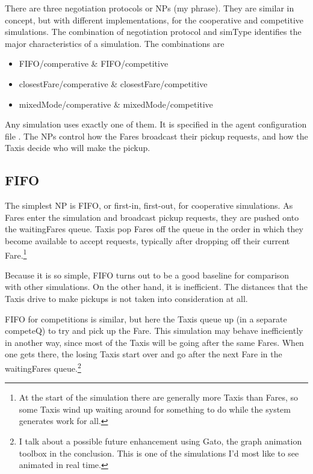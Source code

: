 \documentclass[11pt,letterpaper,onecolumn,twoside,openright,final]{report}
\begin{document}
There are three negotiation protocols or NPs (my phrase).
They are similar in concept, but with different implementations, for the cooperative and competitive simulations.
The combination of negotiation protocol and simType identifies the major characteristics of a simulation.
The combinations are

\vspace{0.5cm}
\begin{itemize}
  \item{FIFO/comperative \& FIFO/competitive}
  \item{closestFare/comperative \& closestFare/competitive}
  \item{mixedMode/comperative \& mixedMode/competitive}
\end{itemize}
\vspace{0.5cm}

Any simulation uses exactly one of them.
It is specified in the agent configuration file .
The NPs control how the Fares broadcast their pickup requests, and how the Taxis decide who will make the pickup.

\subsection{FIFO}
The simplest NP is FIFO, or first-in, first-out, for cooperative simulations.
As Fares enter the simulation and broadcast pickup requests, they are pushed onto the waitingFares queue.
Taxis pop Fares off the queue in the order in which they become available to accept requests, typically after dropping off their current Fare.\footnote{At the start of the simulation there are generally more Taxis than Fares, so some Taxis wind up waiting around for something to do while the system generates work for all.}

Because it is so simple, FIFO turns out to be a good baseline for comparison with other simulations.
On the other hand, it is inefficient.
The distances that the Taxis drive to make pickups is not taken into consideration at all.

FIFO for competitions is similar, but here the Taxis queue up (in a separate competeQ) to try and pick up the Fare.
This simulation may behave inefficiently in another way, since most of the Taxis will be going after the same Fares.
When one gets there, the losing Taxis start over and go after the next Fare in the waitingFares queue.\footnote{I talk about a possible future enhancement using Gato, the graph animation toolbox in the conclusion. This is one of the simulations I'd most like to see animated in real time.}
\end{document}
